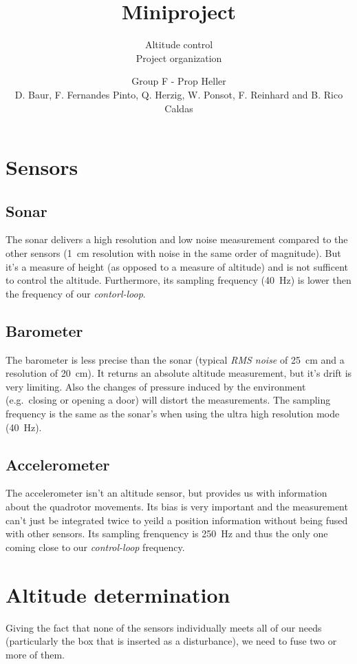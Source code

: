 \documentclass{repMobRob}
\author{Group F - Prop Heller \\ D. Baur, F. Fernandes Pinto, Q. Herzig, W. Ponsot, F. Reinhard and B. Rico Caldas}
\title{Miniproject}
\subtitle{Altitude control \\ \small{Project organization}}
\begin{document}
\thispagestyle{empty}
\maketitle

\section{Sensors}
\subsection{Sonar}
The sonar delivers a high resolution and low noise measurement compared to the other sensors (\SI{1}{\centi\meter} resolution with noise in the same order of magnitude).
But it's a measure of height (as opposed to a measure of altitude) and is not sufficent to control the altitude.
Furthermore, its sampling frequency (\SI{40}{\hertz}) is lower then the frequency of our \emph{contorl-loop}.

\subsection{Barometer}
The barometer is less precise than the sonar (typical \emph{RMS noise} of \SI{25}{\centi\meter} and a resolution of \SI{20}{\centi\meter}).
It returns an absolute altitude measurement, but it's drift is very limiting.
Also the changes of pressure induced by the environment (e.g.\ closing or opening a door) will distort the measurements.
The sampling frequency is the same as the sonar's when using the ultra high resolution mode (\SI{40}{\hertz}).

\subsection{Accelerometer}
The accelerometer isn't an altitude sensor, but provides us with information about the quadrotor movements.
Its bias is very important and the measurement can't just be integrated twice to yeild a position information without being fused with other sensors.
Its sampling frenquency is \SI{250}{\hertz} and thus the only one coming close to our \emph{control-loop} frequency. 

\section{Altitude determination}
Giving the fact that none of the sensors individually meets all of our needs (particularly the box that is inserted as a disturbance), we need to fuse two or more of them. 
\end{document}
